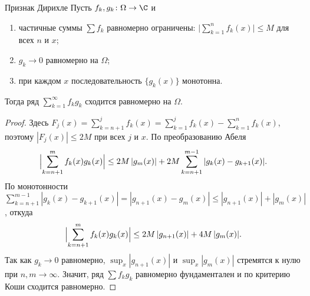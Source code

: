 \begin{Theorem}{Признак Дирихле}{}
	Пусть $f_k, g_k \colon \Omega \to \C$ и
	\begin{enumerate}
		\item частичные суммы $\sum f_k$ равномерно ограничены: $\bigl|\sum_{k=1}^{n} f_k(x)\bigr| \le M$ для всех $n$ и $x$;
		\item $g_k \to 0$ равномерно на $\Omega$;
		\item при каждом $x$ последовательность $\{g_k(x)\}$ монотонна.
	\end{enumerate}
	Тогда ряд $\sum_{k=1}^{\infty} f_k g_k$ сходится равномерно на $\Omega$.
\end{Theorem}

\begin{proof}
	Здесь $F_j(x) = \sum_{k=n+1}^{j} f_k(x) = \sum_{k=1}^{j} f_k(x) - \sum_{k=1}^{n} f_k(x)$, поэтому $|F_j(x)| \le 2M$ при всех $j$ и $x$. По преобразованию Абеля
	\[
	\Bigl| \sum_{k=n+1}^{m} f_k(x) g_k(x) \Bigr| \le 2M\,|g_m(x)| + 2M \sum_{k=n+1}^{m-1} |g_k(x) - g_{k+1}(x)|.
	\]
	По монотонности $\sum_{k=n+1}^{m-1}|g_k(x) - g_{k+1}(x)| = |g_{n+1}(x) - g_m(x)| \le |g_{n+1}(x)| + |g_m(x)|$, откуда
	\[
	\Bigl| \sum_{k=n+1}^{m} f_k(x) g_k(x) \Bigr| \le 2M\,|g_{n+1}(x)| + 4M\,|g_m(x)|.
	\]
	Так как $g_k \to 0$ равномерно, $\sup_x |g_{n+1}(x)|$ и $\sup_x |g_m(x)|$ стремятся к нулю при $n, m \to \infty$. Значит, ряд $\sum f_k g_k$ равномерно фундаментален и по критерию Коши сходится равномерно.
\end{proof}
